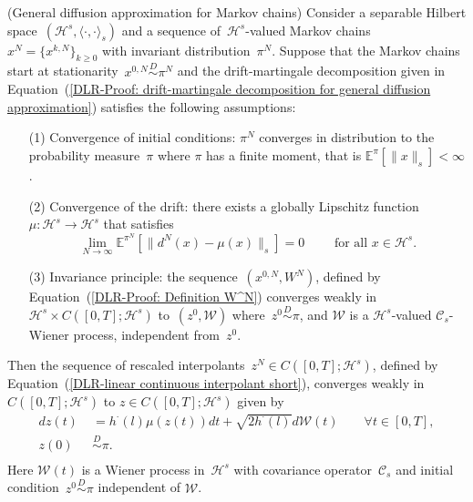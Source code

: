 \begin{proposition}\autocite[Proposition 3.1]{Pillai2012}(General diffusion approximation for Markov chains)
  \label{DLR-Proof: Proposition General diffusion approximation}
  Consider a separable Hilbert space~$(\mathcal{H}^s, \langle \cdot, \cdot \rangle_s)$ and a sequence of~$\mathcal{H}^s$-valued Markov chains~$x^N = \{ x^{k,N} \}_{k \geq 0}$ with invariant distribution~$\pi^N$. Suppose that the Markov chains start at stationarity~$x^{0,N} \stackrel{D}{\sim} \pi^N$ and the drift-martingale decomposition given in Equation~(\ref{DLR-Proof: drift-martingale decomposition for general diffusion approximation}) satisfies the following assumptions:
  \begin{enumerate}
    \item[(1)] Convergence of initial conditions: $\pi^N$ converges in distribution to the probability measure~$\pi$ where $\pi$ has a finite moment, that is $\mathbb{E}^{\pi}[\|x\|_s]<\infty$. 
    \item[(2)] Convergence of the drift: there exists a globally Lipschitz function~$\mu:\mathcal{H}^s \to \mathcal{H}^s$ that satisfies
    \begin{equation*}
      \lim_{N \to \infty} \mathbb{E}^{\pi^N}[ \|  d^N(x) - \mu(x) \|_{s} ] = 0 \qquad \text{ for all } x \in \mathcal{H}^s.
    \end{equation*}
    \item[(3)] Invariance principle: the sequence~$(x^{0,N}, W^N)$, defined by Equation~(\ref{DLR-Proof: Definition W^N}) converges weakly in $\mathcal{H}^s \times C([0,T]; \mathcal{H}^s)$ to~$(z^0, \mathcal{W})$ where~$z^0 \stackrel{D}{\sim} \pi$, and $\mathcal{W}$ is a $\mathcal{H}^s$-valued $\mathcal{C}_s$-Wiener process, independent from~$z^0$.
  \end{enumerate}
  
  Then the sequence of rescaled interpolants~$z^N \in C([0,T]; \mathcal{H}^s)$, defined by Equation~(\ref{DLR-linear continuous interpolant short}), converges weakly in $ C([0,T]; \mathcal{H}^s)$ to $z \in  C([0,T]; \mathcal{H}^s)$ given by
  \begin{equation*}
    \begin{split}
     dz(t) & \;=   h^{\cdot}(l) \mu(z(t)) dt + \sqrt{2 h^{\cdot}(l)} d\mathcal{W}(t) \qquad \forall t \in [0,T], \\
     z(0) & \; \stackrel{D}{\sim} \pi.\\
    \end{split}
  \end{equation*}
  Here $\mathcal{W}(t)$ is a Wiener process in~$\mathcal{H}^s$ with covariance operator~$\mathcal{C}_s$ and initial condition~$z^0 \stackrel{D}{\sim} \pi$ independent of $\mathcal{W}$.

\end{proposition}

